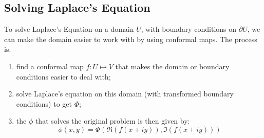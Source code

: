 \documentclass[../Main.tex]{subfiles}
\begin{document}
\subsection{Solving Laplace's Equation}
To solve Laplace's Equation on a domain $U$, with boundary conditions on $\partial U$, we can make the domain easier to work with by using conformal maps. The process is:
\begin{enumerate}
    \item find a conformal map $f : U \mapsto V$ that makes the domain or boundary conditions easier to deal with;
    \item solve Laplace's equation on this domain (with transformed boundary conditions) to get $\Phi$;
    \item the $\phi$ that solves the original problem is then given by:
        \begin{equation*}
            \phi(x, y) = \Phi(\Re(f(x + i y)), \Im(f(x + i y)))
        \end{equation*}
\end{enumerate}
\end{document}
